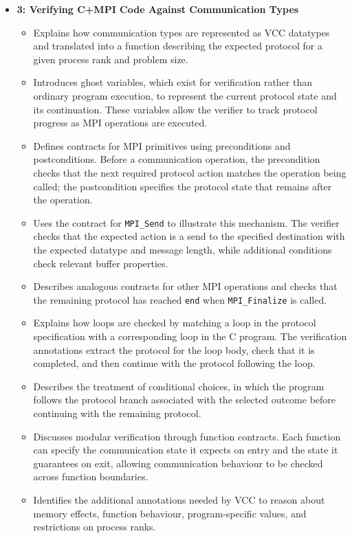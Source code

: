 \begin{itemize}
    \item \textbf{3: Verifying C+MPI Code Against Communication Types}
    \begin{itemize}
        \item Explains how communication types are represented as VCC datatypes and translated into a function describing the expected protocol for a given process rank and problem size.
        \item Introduces ghost variables, which exist for verification rather than ordinary program execution, to represent the current protocol state and its continuation. These variables allow the verifier to track protocol progress as MPI operations are executed.
        \item Defines contracts for MPI primitives using preconditions and postconditions. Before a communication operation, the precondition checks that the next required protocol action matches the operation being called; the postcondition specifies the protocol state that remains after the operation.
        \item Uses the contract for \texttt{MPI\_Send} to illustrate this mechanism. The verifier checks that the expected action is a send to the specified destination with the expected datatype and message length, while additional conditions check relevant buffer properties.
        \item Describes analogous contracts for other MPI operations and checks that the remaining protocol has reached \texttt{end} when \texttt{MPI\_Finalize} is called.
        \item Explains how loops are checked by matching a loop in the protocol specification with a corresponding loop in the C program. The verification annotations extract the protocol for the loop body, check that it is completed, and then continue with the protocol following the loop.
        \item Describes the treatment of conditional choices, in which the program follows the protocol branch associated with the selected outcome before continuing with the remaining protocol.
        \item Discusses modular verification through function contracts. Each function can specify the communication state it expects on entry and the state it guarantees on exit, allowing communication behaviour to be checked across function boundaries.
        \item Identifies the additional annotations needed by VCC to reason about memory effects, function behaviour, program-specific values, and restrictions on process ranks.
    \end{itemize}


\end{itemize}
